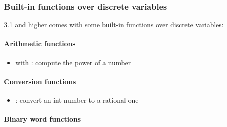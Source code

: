 \subsubsection{Built-in functions over discrete variables}\label{section:builtin-functions}

\imitator{} 3.1 and higher comes with some built-in functions over discrete variables:

\paragraph{Arithmetic functions}

\begin{itemize}
    \item {} with : compute the power of a number
\end{itemize}

\paragraph{Conversion functions}

\begin{itemize}
    \item {}: convert an int number to a rational one
\end{itemize}

\paragraph{Binary word functions}

